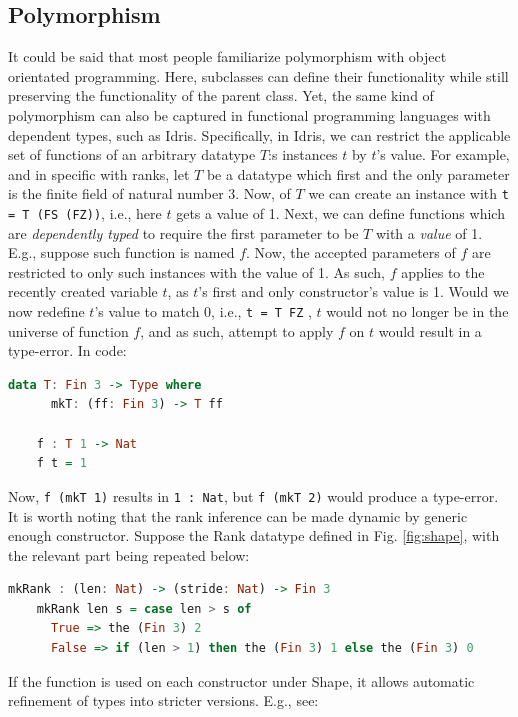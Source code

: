 \documentclass{report}
\begin{document}
\subsection{Polymorphism}
\label{section:polymorphism}

It could be said that most people familiarize polymorphism with object orientated programming. Here, subclasses can define their functionality while still preserving the functionality of the parent class. Yet, the same kind of polymorphism can also be captured in functional programming languages with dependent types, such as Idris. Specifically, in Idris, we can restrict the applicable set of functions of an arbitrary datatype $T$:s instances $t$ by $t$'s value. For example, and in specific with ranks, let $T$ be a datatype which first and the only parameter is the finite field of natural number 3. Now, of $T$ we can create an instance with \verb|t = T (FS (FZ))|, i.e., here $t$ gets a value of 1. Next, we can define functions which are \emph{dependently typed} to require the first parameter to be $T$ with a \emph{value} of 1. E.g., suppose such function is named $f$. Now, the accepted parameters of $f$ are restricted to only such instances with the value of 1. As such, $f$ applies to the recently created variable $t$, as $t$'s first and only constructor's value is 1. Would we now redefine $t$'s value to match 0, i.e., \verb|t = T FZ| , $t$ would not no longer be in the universe of function $f$, and as such, attempt to apply $f$ on $t$ would result in a type-error. In code:

\begin{lstlisting}[language=Haskell]
    data T: Fin 3 -> Type where
      mkT: (ff: Fin 3) -> T ff

    f : T 1 -> Nat
    f t = 1
\end{lstlisting}

Now, \verb|f (mkT 1)| results in \verb|1 : Nat|, but \verb|f (mkT 2)| would produce a type-error. It is worth noting that the rank inference can be made dynamic by generic enough constructor. Suppose the Rank datatype defined in Fig. \ref{fig:shape}, with the relevant part being repeated below:

\begin{lstlisting}[language=Haskell]
    mkRank : (len: Nat) -> (stride: Nat) -> Fin 3
    mkRank len s = case len > s of
      True => the (Fin 3) 2
      False => if (len > 1) then the (Fin 3) 1 else the (Fin 3) 0
\end{lstlisting}

If the function is used on each constructor under Shape, it allows automatic refinement of types into stricter versions. E.g., see:
\end{document}
